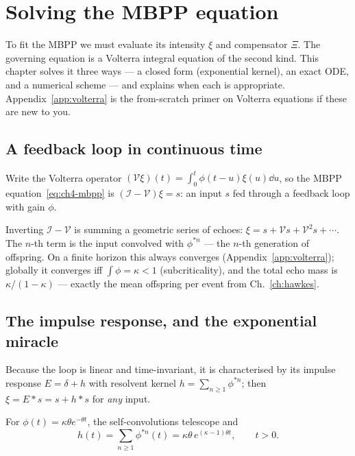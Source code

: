 \chapter{Solving the MBPP equation}
\label{ch:solving}

\begin{motivation}
To fit the MBPP we must evaluate its intensity $\xi$ and compensator $\Xi$. The
governing equation is a Volterra integral equation of the second kind. This chapter
solves it three ways --- a closed form (exponential kernel), an exact ODE, and a
numerical scheme --- and explains when each is appropriate. Appendix~\ref{app:volterra}
is the from-scratch primer on Volterra equations if these are new to you.
\end{motivation}

\section{A feedback loop in continuous time}

Write the Volterra operator $(\mathcal V\xi)(t)=\int_0^t\phi(t-u)\xi(u)\dd u$, so
the MBPP equation~\eqref{eq:ch4-mbpp} is $(\mathcal I-\mathcal V)\xi=s$: an input
$s$ fed through a feedback loop with gain $\phi$.

\begin{intuitionbox}
Inverting $\mathcal I-\mathcal V$ is summing a geometric series of echoes:
$\xi=s+\mathcal V s+\mathcal V^2 s+\cdots$. The $n$-th term is the input convolved
with $\phi^{*n}$ --- the $n$-th generation of offspring. On a finite horizon this
always converges (Appendix~\ref{app:volterra}); globally it converges iff
$\int\phi=\kappa<1$ (subcriticality), and the total echo mass is $\kappa/(1-\kappa)$
--- exactly the mean offspring per event from Ch.~\ref{ch:hawkes}.
\end{intuitionbox}

\section{The impulse response, and the exponential miracle}

Because the loop is linear and time-invariant, it is characterised by its impulse
response $E=\delta+h$ with resolvent kernel $h=\sum_{n\ge1}\phi^{*n}$; then
$\xi=E*s=s+h*s$ for \emph{any} input.

\begin{theorem}\label{thm:ch5-h}
For $\phi(t)=\kappa\theta e^{-\theta t}$, the self-convolutions telescope and
\begin{equation}
h(t)=\sum_{n\ge1}\phi^{*n}(t)=\kappa\theta\,e^{(\kappa-1)\theta t},\qquad t>0 .
\end{equation}
\end{theorem}

